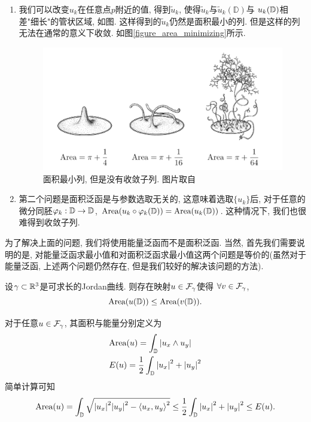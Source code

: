 \begin{enumerate}
    \item 我们可以改变$u_k$在任意点$p$附近的值, 得到$\tilde{u}_k$, 使得$\tilde{u}_k$与$\tilde{u}_k(\mathbb{D})$与 $u_k({\mathbb{D}})$相差"细长"的管状区域, 如图. 这样得到的$\tilde{u}_k$仍然是面积最小的列. 但是这样的列无法在通常的意义下收敛.  如图\eqref{figure_area_minimizing}所示.
    \begin{figure}[ht]
        \centering
        \includegraphics[scale=0.7]{images/area_minimizing.png}
        \caption{面积最小列, 但是没有收敛子列. 图片取自\cite{Morgan}}
        \label{figure_area_minimizing}
    \end{figure}
    \item 第二个问题是面积泛函是与参数选取无关的, 这意味着选取$\{u_k\}$后, 对于任意的微分同胚${\varphi}_k: {\mathbb{D}} \to {\mathbb{D}}$, $\text{Area}(u_k\circ {\varphi}_k({\mathbb{D}}))= \text{Area}(u_k({\mathbb{D}}))$. 这种情况下, 我们也很难得到收敛子列.
\end{enumerate}
为了解决上面的问题, 我们将使用能量泛函而不是面积泛函. 当然, 首先我们需要说明的是, 对能量泛函求最小值和对面积泛函求最小值这两个问题是等价的(虽然对于能量泛函, 上述两个问题仍然存在, 但是我们较好的解决该问题的方法).
\begin{theorem} \label{rado_douglas}
    设$\gamma \subset {\mathbb{R}}^3$是可求长的Jordan曲线. 则存在映射$u \in {\mathcal{F}_\gamma}$使得 $\forall v \in {\mathcal{F}_\gamma}$, 
    \begin{equation}
        \text{Area}(u({\mathbb{D}}))\le \text{Area}(v({\mathbb{D}})).
    \end{equation}
\end{theorem}
对于任意$u \in {\mathcal{F}_\gamma}$, 其面积与能量分别定义为
\begin{align}
    &\text{Area}(u)=\int_{\mathbb{D}}{\left | u_x\wedge u_y \right |} \\
    &{E}(u)=\frac{1}{2}\int_{\mathbb{D}}{\left | u_x \right |}^2+{\left | u_y \right |}^2
\end{align}
简单计算可知
\begin{equation}\label{AleE}
    \text{Area}(u)=\int_{\mathbb{D}} \sqrt{{\left | u_x \right |}^2{\left | u_y \right |}^2-{\left < u_x, u_y \right >}^2} \le \frac{1}{2}\int_{\mathbb{D}} {\left | u_x \right |}^2+{\left | u_y \right |}^2 \le{E}(u).
\end{equation}
